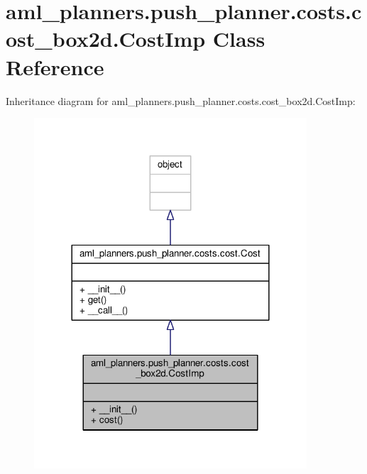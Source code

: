 \hypertarget{classaml__planners_1_1push__planner_1_1costs_1_1cost__box2d_1_1_cost_imp}{\section{aml\-\_\-planners.\-push\-\_\-planner.\-costs.\-cost\-\_\-box2d.\-Cost\-Imp Class Reference}
\label{classaml__planners_1_1push__planner_1_1costs_1_1cost__box2d_1_1_cost_imp}
}


Inheritance diagram for aml\-\_\-planners.\-push\-\_\-planner.\-costs.\-cost\-\_\-box2d.\-Cost\-Imp\-:\nopagebreak
\begin{figure}[H]
\begin{center}
\leavevmode
\includegraphics[width=288pt]{classaml__planners_1_1push__planner_1_1costs_1_1cost__box2d_1_1_cost_imp__inherit__graph}
\end{center}
\end{figure}


